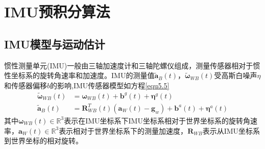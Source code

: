 \section{IMU预积分算法}

\subsection{IMU模型与运动估计}
惯性测量单元(IMU)一般由三轴加速度计和三轴陀螺仪组成，测量传感器相对于惯性坐标系的旋转角速率和加速度。IMU的测量值$\widetilde{\boldsymbol{a}}_B(t)$，$\widetilde{\boldsymbol{\omega}}_{W\!B}(t)$受高斯白噪声$\eta$和传感器偏移$b$的影响,IMU传感器模型如方程\eqref{equ5.5}
\begin{equation}
\label{equ5.5}
\begin{aligned}
\widetilde{\boldsymbol{\omega}}_{W\!B}(t) &= \boldsymbol{\omega}_{W\!B}(t)+\boldsymbol{b}^g(t)+\boldsymbol{\eta}^g(t) \\
\widetilde{\boldsymbol{a}}_B(t) &= \boldsymbol{R}_{W\!B}^T(t)(\boldsymbol{a}_W(t)-\boldsymbol{g}_w)+\boldsymbol{b}^a(t)+\boldsymbol{\eta}^a(t)
\end{aligned}
\end{equation}
其中$\boldsymbol{\omega}_{W\!B}(t) \in \mathds{R}^3$表示在IMU坐标系下IMU坐标系相对于世界坐标系的旋转角速率，$\boldsymbol{a}_W(t) \in \mathds{R}^3$表示相对于世界坐标系下的测量加速度，$\boldsymbol{R}_{W\!B}$表示从IMU坐标系到世界坐标的相对旋转。

